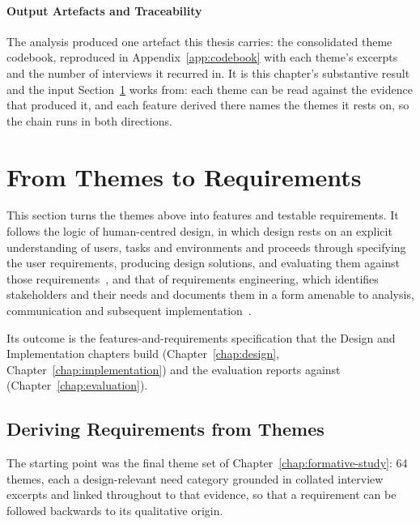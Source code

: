 \paragraph{Output Artefacts and Traceability}
\label{sec:output-traceability}
The analysis produced one artefact this thesis carries: the consolidated theme codebook, reproduced in Appendix~\ref{app:codebook} with each theme's excerpts and the number of interviews it recurred in. It is this chapter's substantive result and the input Section~\ref{chap:from-themes-to-requirements} works from: each theme can be read against the evidence that produced it, and each feature derived there names the themes it rests on, so the chain runs in both directions.

\section{From Themes to Requirements}
\label{chap:from-themes-to-requirements}

This section turns the themes above into features and testable requirements. It follows the logic of human-centred design, in which design rests on an explicit understanding of users, tasks and environments and proceeds through specifying the user requirements, producing design solutions, and evaluating them against those requirements~\cite{iso9241_210}, and that of requirements engineering, which identifies stakeholders and their needs and documents them in a form amenable to analysis, communication and subsequent implementation~\cite[p.~37]{nuseibeh_requirements_2000}.

Its outcome is the features-and-requirements specification that the Design and Implementation chapters build (Chapter~\ref{chap:design}, Chapter~\ref{chap:implementation}) and the evaluation reports against (Chapter~\ref{chap:evaluation}).

\subsection{Deriving Requirements from Themes}
\label{sec:derivation-process}

The starting point was the final theme set of Chapter~\ref{chap:formative-study}: 64 themes, each a design-relevant need category grounded in collated interview excerpts and linked throughout to that evidence, so that a requirement can be followed backwards to its qualitative origin.

